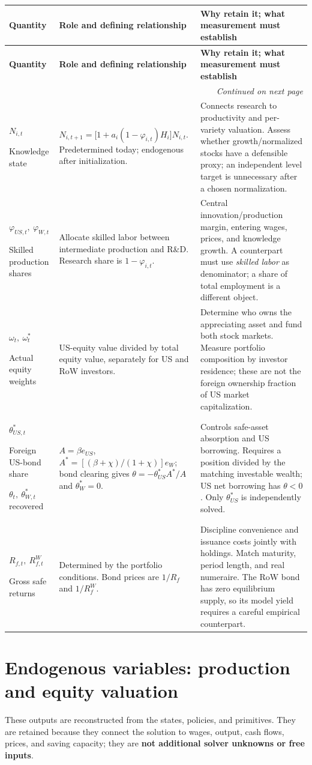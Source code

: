 \documentclass[10pt,a4paper,landscape]{article}
\makeatletter
\newenvironment{coretable}{%
\begin{longtable}{@{}P{\dimexpr .19\textwidth-3.8pt\relax}P{\dimexpr .35\textwidth-7pt\relax}P{\dimexpr .46\textwidth-9.2pt\relax}@{}}
\toprule
\rowcolor{tablehead}\textbf{Quantity} & \textbf{Role and defining relationship} & \textbf{Why retain it; what measurement must establish}\\
\midrule
\endfirsthead
\toprule
\rowcolor{tablehead}\textbf{Quantity} & \textbf{Role and defining relationship} & \textbf{Why retain it; what measurement must establish}\\
\midrule
\endhead
\midrule\multicolumn{3}{r}{\footnotesize\itshape Continued on next page}\\
\endfoot
\bottomrule
\endlastfoot
}{\end{longtable}}
\makeatother
\begin{document}
\begin{coretable}
$N_{i,t}$\par Knowledge state & $N_{i,t+1}=\big[1+a_i(1-\varphi_{i,t})H_i\big]N_{i,t}$. Predetermined today; endogenous after initialization. & Connects research to productivity and per-variety valuation. Assess whether growth/normalized stocks have a defensible proxy; an independent level target is unnecessary after a chosen normalization.\\[4pt]
$\varphi_{US,t},\ \varphi_{W,t}$\par Skilled production shares & Allocate skilled labor between intermediate production and R\&D. Research share is $1-\varphi_{i,t}$. & Central innovation/production margin, entering wages, prices, and knowledge growth. A counterpart must use \emph{skilled labor} as denominator; a share of total employment is a different object.\\[4pt]
$\omega_t,\ \omega_t^*$\par Actual equity weights & US-equity value divided by total equity value, separately for US and RoW investors. & Determine who owns the appreciating asset and fund both stock markets. Measure portfolio composition by investor residence; these are not the foreign ownership fraction of US market capitalization.\\[4pt]
$\theta_{US,t}^*$\par Foreign US-bond share\par$\theta_t,\ \theta_{W,t}^*$ recovered & $A=\beta e_{US}$, $A^*=[(\beta+\chi)/(1+\chi)]e_W$; bond clearing gives $\theta=-\theta_{US}^*A^*/A$ and $\theta_W^*=0$. & Controls safe-asset absorption and US borrowing. Requires a position divided by the matching investable wealth; US net borrowing has $\theta<0$. Only $\theta_{US}^*$ is independently solved.\\[4pt]
$R_{f,t},\ R_{f,t}^W$\par Gross safe returns & Determined by the portfolio conditions. Bond prices are $1/R_f$ and $1/R_f^W$. & Discipline convenience and issuance costs jointly with holdings. Match maturity, period length, and real numeraire. The RoW bond has zero equilibrium supply, so its model yield requires a careful empirical counterpart.\\[4pt]
\end{coretable}

\clearpage
\section{Endogenous variables: production and equity valuation}
These outputs are reconstructed from the states, policies, and primitives. They are retained because they connect the solution to wages, output, cash flows, prices, and saving capacity; they are \textbf{not additional solver unknowns or free inputs}.
\end{document}

